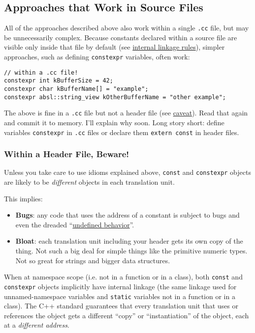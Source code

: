 \subsection{Approaches that Work in Source Files}
All of the approaches described above also work within a single \texttt{.cc} file, but may be unnecessarily complex. Because constants declared within a source file are visible only inside that file by default (see \href{http://en.cppreference.com/w/cpp/language/storage_duration}{internal linkage rules}), simpler approaches, such as defining \texttt{constexpr} variables, often work:
\begin{verbatim}
// within a .cc file!
constexpr int kBufferSize = 42;
constexpr char kBufferName[] = "example";
constexpr absl::string_view kOtherBufferName = "other example";
\end{verbatim}
The above is fine in a \texttt{.cc} file but not a header file (see \hyperref[subsubsec:non-portable-mistake]{caveat}). Read that again and commit it to memory. I’ll explain why soon. Long story short: define variables \texttt{constexpr} in \texttt{.cc} files or declare them \texttt{extern const} in header files.

\subsubsection{Within a Header File, Beware!}
Unless you take care to use idioms explained above, \texttt{const} and \texttt{constexpr} objects are likely to be \emph{different} objects in each translation unit.

This implies:
\begin{itemize}
    \item \textbf{Bugs}: any code that uses the address of a constant is subject to bugs and even the dreaded \enquote{\href{https://en.cppreference.com/w/cpp/language/ub}{undefined behavior}}.
    \item \textbf{Bloat}: each translation unit including your header gets its own copy of the thing. Not such a big deal for simple things like the primitive numeric types. Not so great for strings and bigger data structures.
\end{itemize}
When at namespace scope (i.e. not in a function or in a class), both \texttt{const} and \texttt{constexpr} objects implicitly have internal linkage (the same linkage used for unnamed-namespace variables and \texttt{static} variables not in a function or in a class). The C++ standard guarantees that every translation unit that uses or references the object gets a different \enquote{copy} or \enquote{instantiation} of the object, each at a \emph{different address}.

